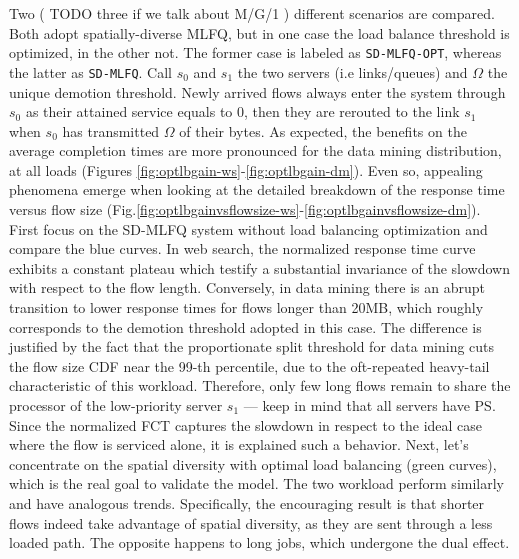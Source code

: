 Two ( TODO three if we talk about M/G/1 ) different scenarios are compared. Both adopt spatially-diverse MLFQ, but in one case the load balance threshold is optimized, in the other not. The former case is labeled as \texttt{SD-MLFQ-OPT}, whereas the latter as \texttt{SD-MLFQ}. Call $s_0$ and $s_1$ the two servers (i.e links/queues) and $\Omega$ the unique demotion threshold. Newly arrived flows always enter the system through $s_0$ as their attained service equals to 0, then they are rerouted to the link $s_1$ when $s_0$ has transmitted $\Omega$ of their bytes. As expected, the benefits on the average completion times are more pronounced for the data mining distribution, at all loads (Figures \ref{fig:optlbgain-ws}-\ref{fig:optlbgain-dm}). Even so, appealing phenomena emerge when looking at the detailed breakdown of the response time versus flow size (Fig.\ref{fig:optlbgainvsflowsize-ws}-\ref{fig:optlbgainvsflowsize-dm}). First focus on the SD-MLFQ system without load balancing optimization and compare the blue curves. In web search, the normalized response time curve exhibits a constant plateau which testify a substantial invariance of the slowdown with respect to the flow length. Conversely, in data mining there is an abrupt transition to lower response times for flows longer than 20MB, which roughly corresponds to the demotion threshold adopted in this case. The difference is justified by the fact that the proportionate split threshold for data mining cuts the flow size CDF near the 99-th percentile, due to the oft-repeated heavy-tail characteristic of this workload. Therefore, only few long flows remain to share the processor of the low-priority server $s_1$ --- keep in mind that all servers have PS. Since the normalized FCT captures the slowdown in respect to the ideal case where the flow is serviced alone, it is explained such a behavior. Next, let's concentrate on the spatial diversity with optimal load balancing (green curves), which is the real goal to validate the model. The two workload perform similarly and have analogous trends. Specifically, the encouraging result is that shorter flows indeed take advantage of spatial diversity, as they are sent through a less loaded path. The opposite happens to long jobs, which undergone the dual effect.
